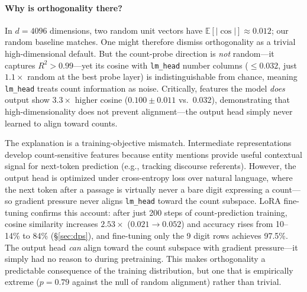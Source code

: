 \documentclass{article}
\begin{document}
\paragraph{Why is orthogonality there?}
In $d{=}4096$ dimensions, two random unit vectors have $\mathbb{E}[|\cos|] \approx 0.012$; our random baseline matches.
One might therefore dismiss orthogonality as a trivial high-dimensional default.
But the count-probe direction is \emph{not} random---it captures $R^2 > 0.99$---yet its
cosine with \texttt{lm\_head} number columns ($\leq 0.032$, just $1.1\times$ random at
the best probe layer) is indistinguishable from chance, meaning \texttt{lm\_head} treats
count information as noise.
Critically, features the model \emph{does} output show $3.3\times$ higher cosine ($0.100 \pm 0.011$ vs.\ $0.032$), demonstrating that high-dimensionality does not prevent alignment---the output head simply never learned to align toward counts.

The explanation is a training-objective mismatch.
Intermediate representations develop count-sensitive features because entity mentions
provide useful contextual signal for next-token prediction (e.g., tracking discourse referents).
However, the output head is optimized under cross-entropy loss over natural language,
where the next token after a passage is virtually never a bare digit expressing a
count---so gradient pressure never aligns \texttt{lm\_head} toward the count subspace.
LoRA fine-tuning confirms this account: after just 200 steps of count-prediction training,
cosine similarity increases $2.53\times$ ($0.021 \to 0.052$) and accuracy rises from
10--14\% to 84\% (\S\ref{sec:dps}), and fine-tuning only the 9 digit rows
achieves 97.5\%.
The output head \emph{can} align toward the count subspace with gradient pressure---it
simply had no reason to during pretraining.
This makes orthogonality a predictable consequence of the training distribution,
but one that is empirically extreme ($p = 0.79$ against the null of random alignment)
rather than trivial.
\end{document}
